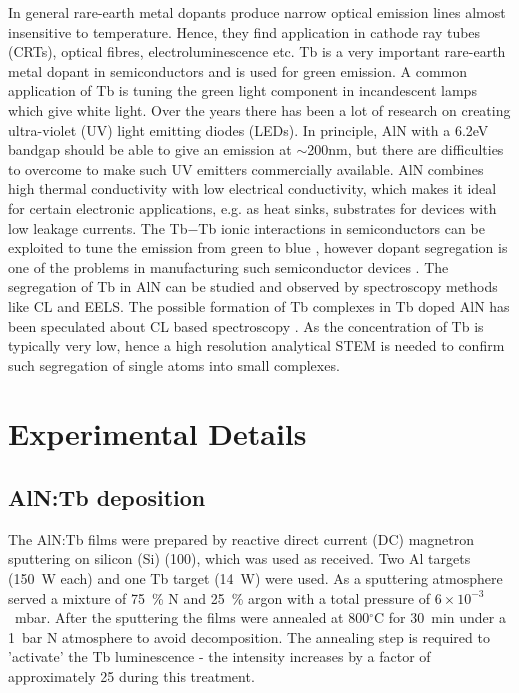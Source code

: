 \documentclass[%
aip,
rsi,%
 amsmath,amssymb,%
 reprint,%
]{revtex4-1}
\begin{document}
In general rare-earth metal dopants\cite{Kenyon2003,Kenyon2002} produce narrow optical emission lines almost insensitive to temperature. Hence, they find application in cathode ray tubes (CRTs), optical fibres, electroluminescence etc\cite{Aitasalo2003}. Tb is a very important rare-earth metal dopant in semiconductors and is used for green emission. A common application of Tb is tuning the green light component in incandescent lamps which give white light. Over the years there has been a lot of research on creating ultra-violet (UV) light emitting diodes (LEDs). In principle, AlN with a 6.2eV bandgap should be able to give an emission at $\sim$200nm, but there are difficulties to overcome to make such UV emitters commercially available. AlN combines high thermal conductivity with low electrical conductivity, which makes it ideal for certain electronic applications, e.g. as heat sinks, substrates for devices with low leakage currents. The Tb$-$Tb ionic interactions in semiconductors can be exploited to tune the emission from green to blue \cite{Benz2013}, however dopant segregation is one of the problems in manufacturing such semiconductor devices \cite{Keizer2015}. The segregation of Tb in AlN can be studied and observed by spectroscopy methods like CL and EELS. The possible formation of Tb complexes in Tb doped AlN has been speculated about CL based spectroscopy \cite{Benz2013_AlNTb}. As the concentration of Tb is typically very low, hence a high resolution analytical STEM is needed to confirm such segregation of single atoms into small complexes.
\section{Experimental Details}
\label{sec:exp_detail}
\subsection{AlN:Tb deposition}
\label{sec:growth}
The AlN:Tb films were prepared by reactive direct current (DC) magnetron sputtering on silicon (Si) (100), which was used as received. Two Al targets (150~W each) and one Tb target (14~W) were used. As a sputtering atmosphere served a mixture of 75~\% N and 25~\% argon with a total pressure of $6 \times 10^{-3}$~mbar. After the sputtering the films were annealed at 800$^\circ$C for 30~min under a 1~bar N atmosphere to avoid decomposition. The annealing step is required to 'activate' the Tb luminescence - the intensity increases by a factor of approximately 25 during this treatment.
\end{document}
